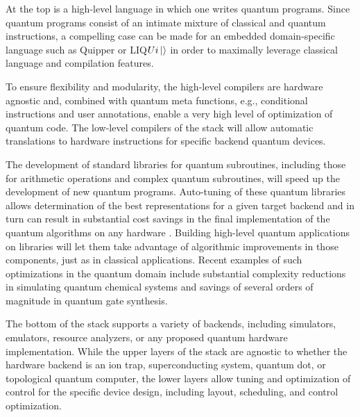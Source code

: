 \documentclass[journal]{IEEEtran}
\begin{document}
At the top is a high-level language in which one writes quantum programs.
Since quantum programs consist of an intimate mixture of classical and quantum instructions, a compelling case can be made for an embedded domain-specific language such as Quipper \cite{green13} or LIQ$Ui\ket{} $\cite{wecker14} in order to maximally leverage classical language and compilation features.

To ensure flexibility and modularity, the high-level compilers are hardware agnostic and, combined with quantum meta functions, e.g., conditional instructions and user annotations, enable a very high level of optimization of quantum code.  
The low-level compilers of the stack will allow automatic translations to hardware instructions for specific backend quantum devices.  

The development of standard libraries for quantum subroutines, including those for arithmetic operations and complex quantum subroutines, will speed up the development of new quantum programs.
Auto-tuning of these quantum libraries allows determination of the best representations for a given target backend and in turn can result in substantial cost savings in the final implementation of the quantum algorithms on any hardware \cite{stack}.  Building high-level quantum applications on libraries will let them take advantage of algorithmic improvements in those components, just as in classical applications. Recent examples of such optimizations in the quantum domain include substantial complexity reductions in simulating quantum chemical systems and savings of several orders of magnitude in quantum gate synthesis.

The bottom of the stack  supports a variety of backends, including simulators, emulators, resource analyzers, or any proposed quantum hardware implementation.
While the upper layers of the stack are agnostic to whether the hardware backend is an ion trap, superconducting system, quantum dot, or topological quantum computer, the lower layers allow tuning and optimization of control for the specific device design, including layout, scheduling, and control optimization.
\end{document}
